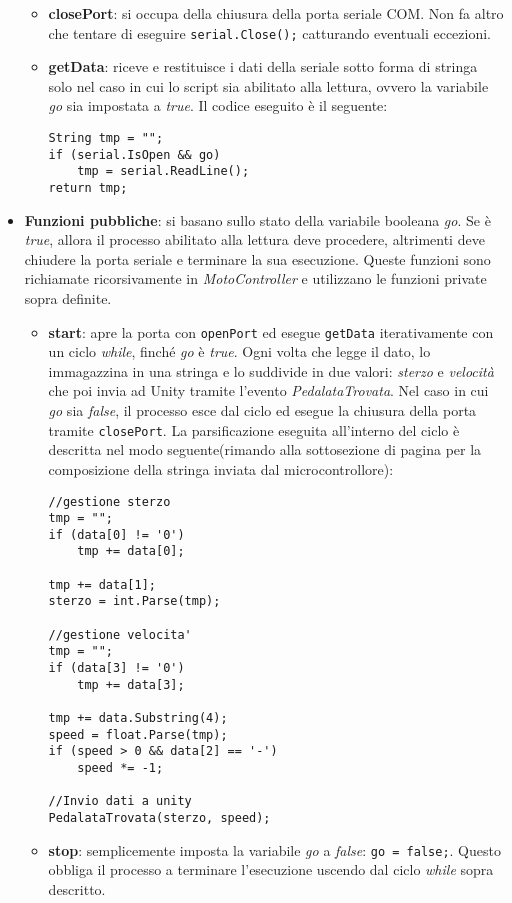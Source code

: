 \begin{itemize}
\begin{itemize}
   \item \textbf{closePort}: si occupa della chiusura della porta seriale COM. Non fa altro che tentare di eseguire \texttt{serial.Close();} catturando eventuali eccezioni.
   \item \textbf{getData}: riceve e restituisce i dati della seriale sotto forma di stringa solo nel caso in cui lo script sia abilitato alla lettura, ovvero la variabile \textit{go} sia impostata a \textit{true}. Il codice eseguito è il seguente:
\begin{lstlisting}
String tmp = "";
if (serial.IsOpen && go)
	tmp = serial.ReadLine();
return tmp;
\end{lstlisting}
\end{itemize}%

  \item \textbf{Funzioni pubbliche}: si basano sullo stato della variabile booleana \textit{go}. Se è \textit{true}, allora il processo abilitato alla lettura deve procedere, altrimenti deve chiudere la porta seriale e terminare la sua esecuzione. Queste funzioni sono richiamate ricorsivamente in \textit{MotoController} e utilizzano le funzioni private sopra definite.
\begin{itemize}
   \item \textbf{start}: apre la porta con \texttt{openPort} ed esegue \texttt{getData} iterativamente con un ciclo \textit{while}, finché \textit{go} è \textit{true}. Ogni volta che legge il dato, lo immagazzina in una stringa e lo suddivide in due valori: \textit{sterzo} e \textit{velocità} che poi invia ad Unity tramite l'evento \textit{PedalataTrovata}. Nel caso in cui \textit{go} sia \textit{false}, il processo esce dal ciclo ed esegue la chiusura della porta tramite \texttt{closePort}. La parsificazione eseguita all'interno del ciclo è descritta nel modo seguente(rimando alla sottosezione \textit{} di pagina \pageref{stringa} per la composizione della stringa inviata dal microcontrollore):
\begin{lstlisting}
//gestione sterzo
tmp = "";
if (data[0] != '0')
	tmp += data[0];
	
tmp += data[1];
sterzo = int.Parse(tmp);

//gestione velocita'
tmp = "";
if (data[3] != '0')
	tmp += data[3];
	
tmp += data.Substring(4);
speed = float.Parse(tmp);
if (speed > 0 && data[2] == '-')
	speed *= -1;

//Invio dati a unity
PedalataTrovata(sterzo, speed);
\end{lstlisting}

\item \textbf{stop}: semplicemente imposta la variabile \textit{go} a \textit{false}: \texttt{go = false;}. Questo obbliga il processo a terminare l'esecuzione uscendo dal ciclo \textit{while} sopra descritto.
\end{itemize}%
\end{itemize}%
\newpage

